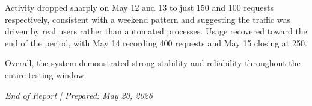 \documentclass[12pt, a4paper]{article}
\begin{document}
Activity dropped sharply on May 12 and 13 to just 150 and 100 requests respectively, consistent with a weekend pattern and suggesting the traffic was driven by real users rather than automated processes. Usage recovered toward the end of the period, with May 14 recording 400 requests and May 15 closing at 250.

Overall, the system demonstrated strong stability and reliability throughout the entire testing window.



\vspace{2em}
\begin{center}
\textit{End of Report \quad | \quad Prepared: May 20, 2026}
\end{center}
\end{document}
